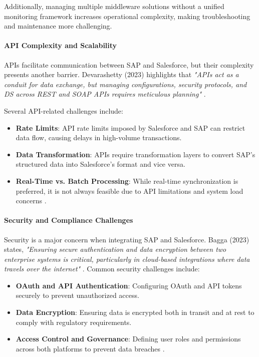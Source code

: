 Additionally, managing multiple middleware solutions without a unified monitoring framework increases operational complexity, making troubleshooting and maintenance more challenging.

\paragraph{API Complexity and Scalability} APIs facilitate communication between SAP and Salesforce, but their complexity presents another barrier. Devarashetty (2023) highlights that \textit{"APIs act as a conduit for data exchange, but managing configurations, security protocols, and DS across REST and SOAP APIs requires meticulous planning"} \cite{devarashetty2023}.

Several API-related challenges include:
\begin{itemize}
\item \textbf{Rate Limits}: API rate limits imposed by Salesforce and SAP can restrict data flow, causing delays in high-volume transactions.
\item \textbf{Data Transformation}: APIs require transformation layers to convert SAP’s structured data into Salesforce’s format and vice versa.
\item \textbf{Real-Time vs. Batch Processing}: While real-time synchronization is preferred, it is not always feasible due to API limitations and system load concerns \cite{devarashetty2023}.
\end{itemize}

\paragraph{Security and Compliance Challenges} Security is a major concern when integrating SAP and Salesforce. Bagga (2023) states, \textit{"Ensuring secure authentication and data encryption between two enterprise systems is critical, particularly in cloud-based integrations where data travels over the internet"} \cite{bagga2023}. Common security challenges include:
\begin{itemize}
\item \textbf{OAuth and API Authentication}: Configuring OAuth and API tokens securely to prevent unauthorized access.
\item \textbf{Data Encryption}: Ensuring data is encrypted both in transit and at rest to comply with regulatory requirements.
\item \textbf{Access Control and Governance}: Defining user roles and permissions across both platforms to prevent data breaches \cite{devarashetty2023}.
\end{itemize}

